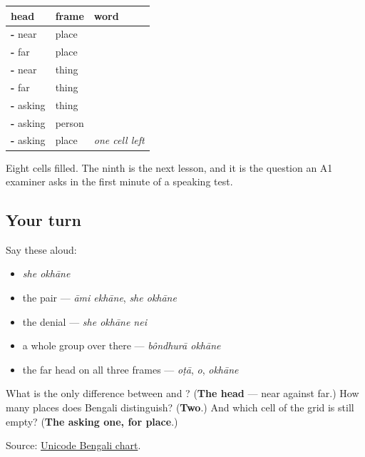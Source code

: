 \begin{grammarlens}[title={Grammar Lens: eight of nine}]
\noindent
\begin{tabularx}{\linewidth}{@{}>{\raggedright\arraybackslash}X>{\raggedright\arraybackslash}X>{\raggedright\arraybackslash}X@{}}
\toprule
\textbf{head} & \textbf{frame} & \textbf{word} \\
\midrule
\textbf{\bn{এ}-} near & place & \textbf{\bn{এখানে}} \\
\textbf{\bn{ও}-} far & place & \textbf{\bn{ওখানে}} \\
\textbf{\bn{এ}-} near & thing & \textbf{\bn{এটা}} \\
\textbf{\bn{ও}-} far & thing & \textbf{\bn{ওটা}} \\
\textbf{\bn{ক}-} asking & thing & \textbf{\bn{কী}} \\
\textbf{\bn{ক}-} asking & person & \textbf{\bn{কে}} \\
\textbf{\bn{ক}-} asking & place & \emph{one cell left} \\
\bottomrule
\end{tabularx}

Eight cells filled. The ninth is the next lesson, and it is the question an A1 examiner asks in the first minute of a speaking test.
\end{grammarlens}

\subsection*{Your turn}
Say these aloud:

\begin{itemize}
\raggedright
  \item \emph{she okhāne}
  \item the pair — \emph{āmi ekhāne}, \emph{she okhāne}
  \item the denial — \emph{she okhāne nei}
  \item a whole group over there — \emph{bôndhurā okhāne}
  \item the far head on all three frames — \emph{oṭā}, \emph{o}, \emph{okhāne}
\end{itemize}

\begin{tcolorbox}[breakable,colback=teal!4,colframe=teal!35!black,title={Before you move on}]
What is the only difference between \textbf{} and \textbf{}? (\textbf{The head} — near against far.) How many places does Bengali distinguish? (\textbf{Two}.) And which cell of the grid is still empty? (\textbf{The asking one, for place}.)

Source: \href{https://www.unicode.org/charts/PDF/U0980.pdf}{Unicode Bengali chart}.
\end{tcolorbox}
